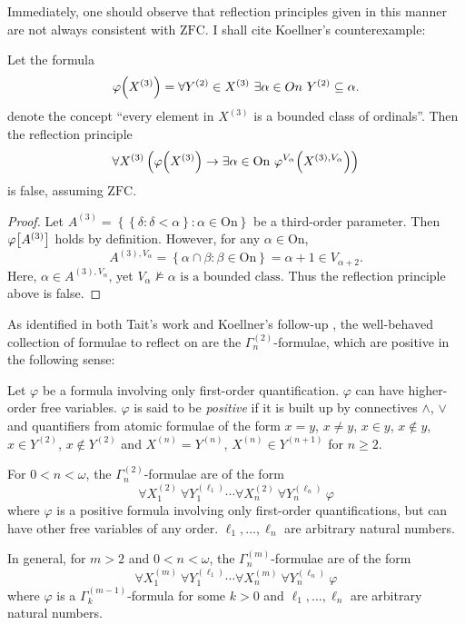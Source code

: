 \documentclass[12pt]{article}
\theoremstyle{plain}
\theoremstyle{definition}
\newcommand{\ZFC}{\mathrm{ZFC}}
\newcommand{\On}{\mathrm{On}}
\begin{document}
Immediately, one should observe that reflection principles given in this manner are not always consistent with $\ZFC$. I shall cite Koellner's counterexample:

\begin{proposition}
	\label{prop:non-positive-reflection-principle-inconsistent}
	Let the formula
	\[\varphi\mleft(X^{(3)}\mright) = \forall Y^{(2)} \in X^{(3)} \ \exists \alpha \in On \ Y^{(2)} \subseteq \alpha.\]
	denote the concept ``every element in $X^{(3)}$ is a bounded class of ordinals''. Then the reflection principle
	\[\forall X^{(3)} \left(\varphi\mleft(X^{(3)}\mright) \rightarrow \exists \alpha \in \On \ \varphi^{V_\alpha}\mleft(X^{(3), V_\alpha}\mright)\right)\]
	is false, assuming $\ZFC$.
\end{proposition}

\begin{proof}
	Let $A^{(3)} = \left\{\left\{\delta : \delta < \alpha\right\} : \alpha \in \On\right\}$ be a third-order parameter. Then $\varphi\mleft[A^{(3)}\mright]$ holds by definition. However, for any $\alpha \in \On$,
	\[A^{(3), V_\alpha} = \left\{\alpha \cap \beta : \beta \in \On\right\} = \alpha + 1 \in V_{\alpha + 2}.\]
	Here, $\alpha \in A^{(3), V_\alpha}$, yet $V_\alpha \nvDash \text{$\alpha$ is a bounded class}$. Thus the reflection principle above is false.
\end{proof}

As identified in both Tait's work \cite{tait-cardinals-from-below} and Koellner's follow-up \cite{reflection-principles}, the well-behaved collection of formulae to reflect on are the $\Gamma^{(2)}_n$-formulae, which are positive in the following sense:

\begin{definition}
	Let $\varphi$ be a formula involving only first-order quantification. $\varphi$ can have higher-order free variables. $\varphi$ is said to be \emph{positive} if it is built up by connectives $\land$, $\lor$ and quantifiers from atomic formulae of the form $x = y$, $x \neq y$, $x \in y$, $x \not\in y$, $x \in Y^{(2)}$, $x \not\in Y^{(2)}$ and $X^{(n)} = Y^{(n)}$, $X^{(n)} \in Y^{(n + 1)}$ for $n \geq 2$.

	For $0 < n < \omega$, the $\Gamma^{(2)}_n$-formulae are of the form
	\[\forall X^{(2)}_1 \ \forall Y^{(\ell_1)}_1 \cdots \forall X^{(2)}_n \ \forall Y^{(\ell_n)}_n \ \varphi\]
	where $\varphi$ is a positive formula involving only first-order quantifications, but can have other free variables of any order. $\ell_1, \ldots, \ell_n$ are arbitrary natural numbers.

	In general, for $m > 2$ and $0 < n < \omega$, the $\Gamma^{(m)}_n$-formulae are of the form
	\[\forall X^{(m)}_1 \ \forall Y^{(\ell_1)}_1 \cdots \forall X^{(m)}_n \ \forall Y^{(\ell_n)}_n \ \varphi\]
	where $\varphi$ is a $\Gamma^{(m - 1)}_k$-formula for some $k > 0$ and $\ell_1, \ldots, \ell_n$ are arbitrary natural numbers.
\end{definition}
\end{document}
